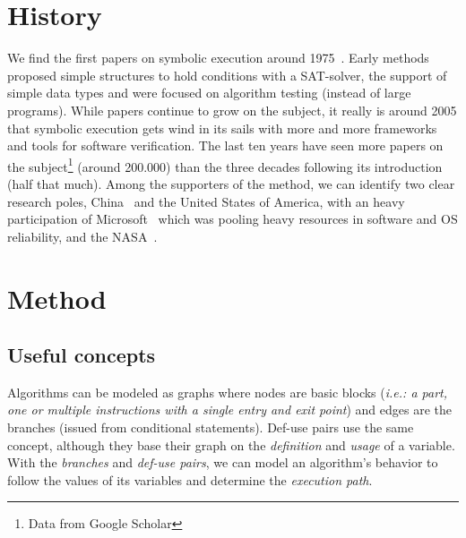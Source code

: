 \documentclass[11pt]{IEEEtran}
\begin{document}
  \section{History}
    We find the first papers on symbolic execution around 1975~\cite{newapproach}. Early methods proposed simple structures to hold conditions with a SAT-solver, the support of simple data types and were focused on algorithm testing (instead of large programs). While papers continue to grow on the subject, it really is around 2005 that symbolic execution gets wind in its sails with more and more frameworks and tools for software verification. The last ten years have seen more papers on the subject\footnote{Data from Google Scholar} (around 200.000) than the three decades following its introduction (half that much). Among the supporters of the method, we can identify two clear research poles, China~\cite{Hardware, memorytablemodel, CHEN2018118} and the United States of America, with an heavy participation of Microsoft~\cite{bouncer-securing-software-by-blocking-bad-input} which was pooling heavy resources in software and OS reliability, and the NASA~\cite{neurosymbolicexecution, DirectedIncrementalSymExe, visserWillemCorina}.

  \section{Method}
    \subsection{Useful concepts}
      Algorithms can be modeled as graphs where nodes are basic blocks (\emph{i.e.: a part, one or multiple instructions with a single entry and exit point}) and edges are the branches (issued from conditional statements). Def-use pairs use the same concept, although they base their graph on the \emph{definition} and \emph{usage} of a variable. With the \emph{branches} and \emph{def-use pairs}, we can model an algorithm's behavior to follow the values of its variables and determine the \emph{execution path}. %
\end{document}
